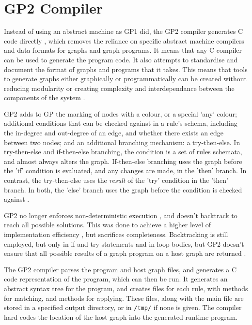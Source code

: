 \documentclass{UoYCSproject}
\begin{document}


\section{GP2 Compiler}
Instead of using an abstract machine as GP1 did, the GP2 compiler generates C code directly \cite{chris_compiler}, which removes the reliance on specific abstract machine compilers and data formats for graphs and graph programs. It means that any C compiler can be used to generate the program code. It also attempts to standardise and document the format of graphs and programs that it takes. This means that tools to generate graphs either graphically or programmatically can be created without reducing modularity or creating complexity and interdependance between the components of the system \cite{gp2_ide}.

GP2 adds to GP the marking of nodes with a colour, or a special 'any' colour; additional conditions that can be checked against in a rule's schema, including the in-degree and out-degree of an edge, and whether there exists an edge between two nodes; and an additional branching mechanism: a try-then-else. In try-then-else and if-then-else branching, the condition is a set of rules schemata, and almost always alters the graph. If-then-else branching uses the graph before the 'if' condition is evaluated, and any changes are made, in the 'then' branch. In contrast, the try-then-else uses the \emph{result} of the 'try' condition in the 'then' branch. In both, the 'else' branch uses the graph before the condition is checked against \cite{gp2_design}.

GP2 no longer enforces non-deterministic execution \cite[p. 15]{gp2_ide}, and doesn't backtrack to reach all possible solutions. This was done to achieve a higher level of implementation efficiency \cite[p. 15]{chris_compiler}, but sacrifices completeness. Backtracking is still employed, but only in if and try statements and in loop bodies, but GP2 doesn't ensure that all possible results of a graph program on a host graph are returned \cite[p. 65]{chris_compiler}.


The GP2 compiler parses the program and host graph files, and generates a C code representation of the program, which can then be run. It generates an abstract syntax tree for the program, and creates files for each rule, with methods for matching, and methods for applying. These files, along with the main file are stored in a specified output directory, or in \texttt{/tmp/} if none is given. The compiler hard-codes the location of the host graph into the generated runtime program.
\end{document}
